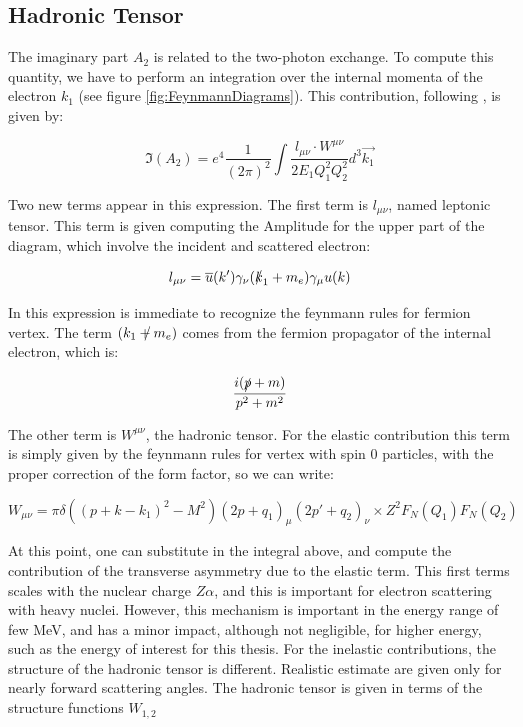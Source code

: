 \subsection{Hadronic Tensor}

The imaginary part $A_{2}$ is related to the two-photon exchange. To compute this quantity, we have to perform an integration over the internal momenta of the electron $k_{1}$ (see figure \ref{fig:FeynmannDiagrams}). This contribution, following \cite{Gorchtein_2008}, is given by:

\begin{equation}
\Im(A_{2}) = e^{4} \frac{1}{(2\pi)^{2}} \int \dfrac{l_{\mu \nu} \cdot W^{\mu \nu}}{2E_{1} Q_{1}^{2} Q_{2}^{2}} d^{3}\vec{k_{1}}
\end{equation}

Two new terms appear in this expression. The first term is $l_{\mu \nu}$, named leptonic tensor. This term is given computing the Amplitude for the upper part of the diagram, which involve the incident and scattered electron:

\begin{equation}
l_{\mu \nu} = \overline{u}(k') \gamma_{\nu} (\slashed{k}_{1} + m_{e}) \gamma_{\mu} u(k)
\end{equation}

In this expression is immediate to recognize the feynmann rules for fermion vertex. The term $(\slashed{k_{1} + m_{e}})$ comes from the fermion propagator of the internal electron, which is:

\begin{align*}
\dfrac{i(\slashed{p} + m)}{p^{2} + m^{2}}
\end{align*}

The other term is $W^{\mu \nu}$, the hadronic tensor. For the elastic contribution this term is simply given by the feynmann rules for vertex with spin 0 particles, with the proper correction of the form factor, so we can write:

\begin{equation}
W_{\mu \nu} = \pi \delta((p + k - k_{1})^{2} - M^{2}) (2p + q_{1})_{\mu} (2p' + q_{2})_{\nu} \times Z^{2} F_{N}(Q_{1})  F_{N}(Q_{2})
\end{equation}

At this point, one can substitute in the integral above, and compute the contribution of the transverse asymmetry due to the elastic term. This first terms scales with the nuclear charge $Z\alpha$, and this is important for electron scattering with heavy nuclei. However, this mechanism is important in the energy range of few MeV, and has a minor impact, although not negligible, for higher energy, such as the energy of interest for this thesis.
For the inelastic contributions, the structure of the hadronic tensor is different. Realistic estimate are given only for nearly forward scattering angles. The hadronic tensor is given in terms of the structure functions $W_{1,2}$

